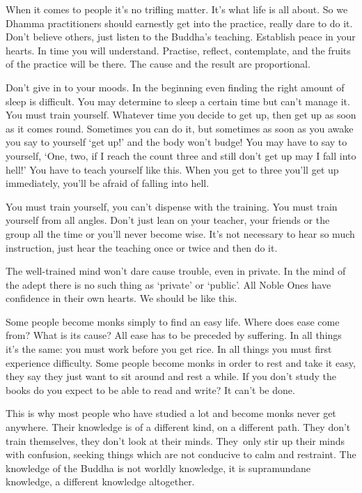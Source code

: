 When it comes to people it's no trifling matter. It's what life is all about. So we Dhamma practitioners should earnestly get into the practice, really dare to do it. Don't believe others, just listen to the Buddha's teaching. Establish peace in your hearts. In time you will understand. Practise, reflect, contemplate, and the fruits of the practice will be there. The cause and the result are proportional.

Don't give in to your moods. In the beginning even finding the right amount of sleep is difficult. You may determine to sleep a certain time but can't manage it. You must train yourself. Whatever time you decide to get up, then get up as soon as it comes round. Sometimes you can do it, but sometimes as soon as you awake you say to yourself `get up!' and the body won't budge! You may have to say to yourself, `One, two, if I reach the count three and still don't get up may I fall into hell!' You have to teach yourself like this. When you get to three you'll get up immediately, you'll be afraid of falling into hell.

You must train yourself, you can't dispense with the training. You must train yourself from all angles. Don't just lean on your teacher, your friends or the group all the time or you'll never become wise. It's not necessary to hear so much instruction, just hear the teaching once or twice and then do it.

The well-trained mind won't dare cause trouble, even in private. In the mind of the adept there is no such thing as `private' or `public'. All Noble Ones have confidence in their own hearts. We should be like this.

Some people become monks simply to find an easy life. Where does ease come from? What is its cause? All ease has to be preceded by suffering. In all things it's the same: you must work before you get rice. In all things you must first experience difficulty. Some people become monks in order to rest and take it easy, they say they just want to sit around and rest a while. If you don't study the books do you expect to be able to read and write? It can't be done.

This is why most people who have studied a lot and become monks never get anywhere. Their knowledge is of a different kind, on a \mbox{different} path. They don't train themselves, they don't look at their minds. They~only stir up their minds with confusion, seeking things which are not conducive to calm and restraint. The knowledge of the Buddha is not worldly knowledge, it is supramundane knowledge, a different knowledge altogether.

